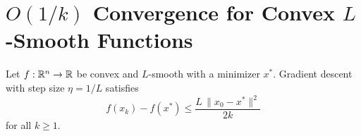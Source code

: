 \documentclass[11pt,a4paper]{article}
\begin{document}

\section{$O(1/k)$ Convergence for Convex $L$-Smooth Functions}\label{sec:convex-rate}

\begin{theorem}\label{thm:convex-rate}
Let $f : \mathbb{R}^n \to \mathbb{R}$ be convex and $L$-smooth with a minimizer $x^*$.
Gradient descent with step size $\eta = 1/L$ satisfies
\begin{equation}\label{eq:convex-rate}
  f(x_k) - f(x^*) \le \frac{L\, \|x_0 - x^*\|^2}{2k}
\end{equation}
for all $k \ge 1$.
\end{theorem}
\end{document}
